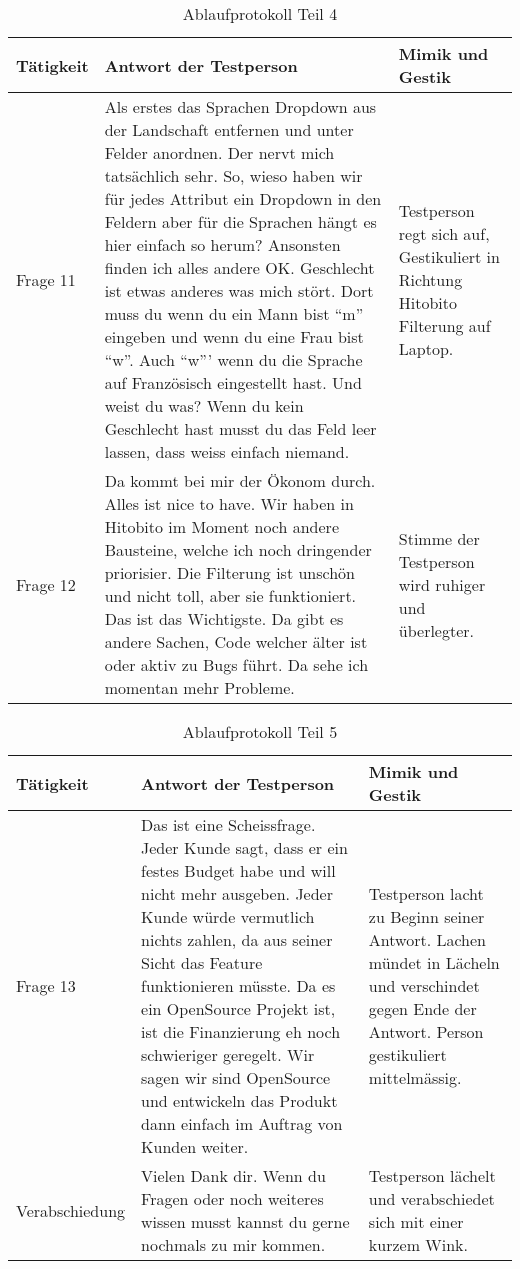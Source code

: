 \begin{table}[h!]
   \begin{tabular}{|L{0.3\textwidth}|L{0.4\textwidth}|L{0.2\textwidth}|}
       \hline
       \color{white}Tätigkeit & \color{white} Antwort der Testperson & \color{white} Mimik und Gestik \\
       \hline
       Frage 11 & Als erstes das Sprachen Dropdown aus der Landschaft entfernen und unter Felder anordnen. Der nervt mich tatsächlich sehr. So, wieso haben wir für jedes
       Attribut ein Dropdown in den Feldern aber für die Sprachen hängt es hier einfach so herum? Ansonsten finden
       ich alles andere OK. Geschlecht ist etwas anderes was mich stört. Dort muss du wenn du ein Mann bist ``m'' eingeben und wenn du eine Frau bist ``w''. 
       Auch ``w''' wenn du die Sprache auf Französisch eingestellt hast. Und weist du was? Wenn du kein Geschlecht hast musst du das Feld leer lassen, dass weiss einfach
       niemand. & Testperson regt sich auf, Gestikuliert in Richtung Hitobito Filterung auf Laptop. \\
       \hline
       Frage 12 & Da kommt bei mir der Ökonom durch. Alles ist nice to have. Wir haben in Hitobito im Moment noch andere Bausteine, welche ich noch dringender priorisier. Die Filterung
       ist unschön und nicht toll, aber sie funktioniert. Das ist das Wichtigste. Da gibt es andere Sachen, Code welcher älter ist oder aktiv zu Bugs führt. Da sehe ich momentan mehr Probleme. 
       & Stimme der Testperson wird ruhiger und überlegter. \\
     \hline
     \end{tabular}
     \caption{Ablaufprotokoll Teil 4}
\end{table}

\newpage

\begin{table}[h!]
   \begin{tabular}{|L{0.3\textwidth}|L{0.4\textwidth}|L{0.2\textwidth}|}
       \hline
       \color{white}Tätigkeit & \color{white} Antwort der Testperson & \color{white} Mimik und Gestik \\
       \hline
       Frage 13 & Das ist eine Scheissfrage. Jeder Kunde sagt, dass er ein festes Budget habe und will nicht mehr ausgeben. Jeder Kunde würde vermutlich nichts zahlen, da
       aus seiner Sicht das Feature funktionieren müsste. Da es ein OpenSource Projekt ist, ist die Finanzierung eh noch schwieriger geregelt. Wir sagen wir sind OpenSource und
       entwickeln das Produkt dann einfach im Auftrag von Kunden weiter.
         & Testperson lacht zu Beginn seiner Antwort. Lachen mündet in Lächeln und verschindet gegen Ende der Antwort. Person gestikuliert mittelmässig. \\
       \hline
       Verabschiedung & Vielen Dank dir. Wenn du Fragen oder noch weiteres wissen musst kannst du gerne nochmals zu mir kommen. & Testperson lächelt und verabschiedet sich mit einer kurzem Wink. \\
     \hline
     \end{tabular}
     \caption{Ablaufprotokoll Teil 5}
\end{table}

